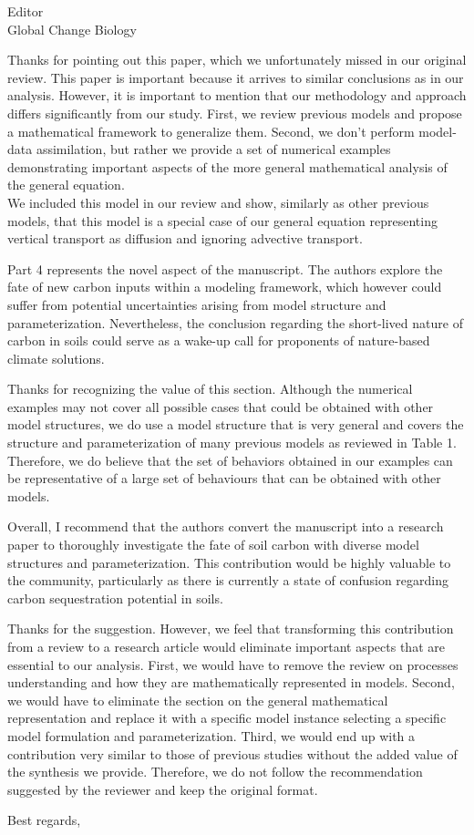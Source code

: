 \documentclass[11pt]{bgcletter}
\newcommand{\answer}[1] {
{\color{cyan} #1}
}
\begin{document}
\begin{letter}{Editor\\
   Global Change Biology
}
\answer{Thanks for pointing out this paper, which we unfortunately missed in our original review. This paper is important because it arrives to similar conclusions as in our analysis. However, it is important to mention that our methodology and approach differs significantly from our study. First, we review previous models and propose a mathematical framework to generalize them. Second, we don't perform model-data assimilation, but rather we provide a set of numerical examples demonstrating important aspects of the more general mathematical analysis of the general equation. \\ We included this model in our review and show, similarly as other previous models, that this model is a special case of our general equation representing vertical transport as diffusion and ignoring advective transport. }

Part 4 represents the novel aspect of the manuscript. The authors explore the fate of new carbon inputs within a modeling framework, which however could suffer from potential uncertainties arising from model structure and parameterization. Nevertheless, the conclusion regarding the short-lived nature of carbon in soils could serve as a wake-up call for proponents of nature-based climate solutions.

\answer{Thanks for recognizing the value of this section. Although the numerical examples may not cover all possible cases that could be obtained with other model structures, we do use a model structure that is very general and covers the structure and parameterization of many previous models as reviewed in Table 1. Therefore, we do believe that the set of behaviors obtained in our examples can be representative of a large set of behaviours that can be obtained with other models.}

Overall, I recommend that the authors convert the manuscript into a research paper to thoroughly investigate the fate of soil carbon with diverse model structures and parameterization. This contribution would be highly valuable to the community, particularly as there is currently a state of confusion regarding carbon sequestration potential in soils.

\answer{Thanks for the suggestion. However, we feel that transforming this contribution from a review to a research article would eliminate important aspects that are essential to our analysis. First, we would have to remove the review on processes understanding and how they are mathematically represented in models. Second, we would have to eliminate the section on the general mathematical representation and replace it with a specific model instance selecting a specific model formulation and parameterization. Third, we would end up with a contribution very similar to those of previous studies without the added value of the synthesis we provide. Therefore, we do not follow the recommendation suggested by the reviewer and keep the original format.}

 \closing{Best regards,} 
 \end{letter}

 
\end{document}
